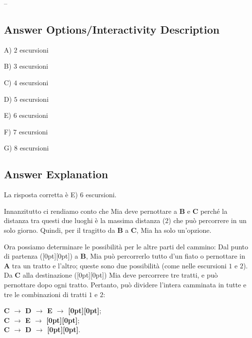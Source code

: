 \documentclass[a4paper,11pt]{report}
\makeatletter
\renewenvironment{adjustwidth}[2]{%
    \begin{list}{}{%
    \partopsep\z@%
    \topsep\z@%
    \listparindent\parindent%
    \parsep\parskip%
    \@ifmtarg{#1}{\setlength{\leftmargin}{\z@}}%
                 {\setlength{\leftmargin}{#1}}%
    \@ifmtarg{#2}{\setlength{\rightmargin}{\z@}}%
                 {\setlength{\rightmargin}{#2}}%
    }
    \item[]}{\end{list}}
\newcommand{\taskGraphicsFolder}{..}
\makeatother
\begin{document}
–

\begingroup
\renewcommand{\arraystretch}{1.5}
\subsection*{Answer Options/Interactivity Description}

A) $2$ escursioni

B) $3$ escursioni

C) $4$ escursioni

D) $5$ escursioni

E) $6$ escursioni

F) $7$ escursioni

G) $8$ escursioni

\endgroup

\subsection*{Answer Explanation}

La risposta corretta è E) $6$ escursioni.

{\centering%
\par}

Innanzitutto ci rendiamo conto che Mia deve pernottare a \textbf{B} e \textbf{C} perché la distanza tra questi due luoghi è la massima distanza ($2$) che può percorrere in un solo giorno.  Quindi, per il tragitto da \textbf{B} a \textbf{C}, Mia ha solo un’opzione.

Ora possiamo determinare le possibilità per le altre parti del cammino:  Dal punto di partenza (\raisebox{-0.5ex}[0pt][0pt]{}) a \textbf{B}, Mia può percorrerlo tutto d’un fiato o pernottare in \textbf{A} tra un tratto e l’altro; queste sono due possibilità (come nelle escursioni $1$ e $2$). Da \textbf{C} alla destinazione (\raisebox{-0.5ex}[0pt][0pt]{}) Mia deve percorrere tre tratti, e può pernottare dopo ogni tratto.  Pertanto, può dividere l’intera camminata in tutte e tre le combinazioni di tratti $1$ e $2$:

\begin{adjustwidth}{1.5em}{0em}
\textbf{C \ensuremath{\rightarrow} D \ensuremath{\rightarrow} E \ensuremath{\rightarrow} \raisebox{-0.5ex}[0pt][0pt]{}};  \\
\textbf{C \ensuremath{\rightarrow} E \ensuremath{\rightarrow} \raisebox{-0.5ex}[0pt][0pt]{}};      \\
\textbf{C \ensuremath{\rightarrow} D \ensuremath{\rightarrow} \raisebox{-0.5ex}[0pt][0pt]{}}.
\end{adjustwidth}
\end{document}
